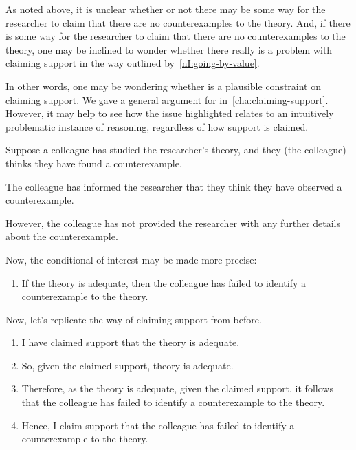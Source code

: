 \begin{note}
  As noted above, it is unclear whether or not there may be some way for the researcher to claim that there are no counterexamples to the theory.
  And, if there is some way for the researcher to claim that there are no counterexamples to the theory, one may be inclined to wonder whether there really is a problem with claiming support in the way outlined by~\ref{nI:going-by-value}.

  In other words, one may be wondering whether \eiS{} is a plausible constraint on claiming support.
  We gave a general argument for \eiS{} in~\autoref{cha:claiming-support}.
  However, it may help to see how the issue highlighted relates to an intuitively problematic instance of reasoning, regardless of how support is claimed.

  \begin{illustration}\label{ill:CE:colleague}
    Suppose a colleague has studied the researcher's theory, and they (the colleague) thinks they have found a counterexample.

    The colleague has informed the researcher that they think they have observed a counterexample.

    However, the colleague has not provided the researcher with any further details about the counterexample.

    Now, the conditional of interest may be made more precise:
    \begin{enumerate}
    \item If the theory is adequate, then the colleague has failed to identify a counterexample to the theory.
    \end{enumerate}

    Now, let's replicate the way of claiming support from before.

    \begin{enumerate}
    \item I have claimed support that the theory is adequate.
    \item So, given the claimed support, theory is adequate.
    \item Therefore, as the theory is adequate, given the claimed support, it follows that the colleague has failed to identify a counterexample to the theory.
    \item Hence, I claim support that the colleague has failed to identify a counterexample to the theory.
    \end{enumerate}
    \vspace{-\baselineskip}
  \end{illustration}


\end{note}
